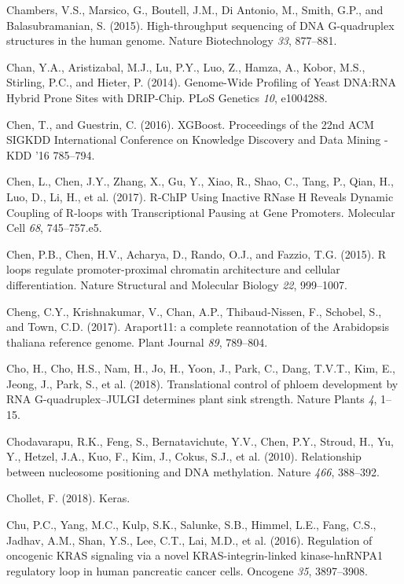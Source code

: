 \documentclass[12pt,a4paper,]{report}
\begin{document}
\leavevmode\hypertarget{ref-Chambers2015}{}%
Chambers, V.S., Marsico, G., Boutell, J.M., Di Antonio, M., Smith, G.P.,
and Balasubramanian, S. (2015). High-throughput sequencing of DNA
G-quadruplex structures in the human genome. Nature Biotechnology
\emph{33}, 877--881.

\leavevmode\hypertarget{ref-Chan2014}{}%
Chan, Y.A., Aristizabal, M.J., Lu, P.Y., Luo, Z., Hamza, A., Kobor,
M.S., Stirling, P.C., and Hieter, P. (2014). Genome-Wide Profiling of
Yeast DNA:RNA Hybrid Prone Sites with DRIP-Chip. PLoS Genetics
\emph{10}, e1004288.

\leavevmode\hypertarget{ref-Chen2016}{}%
Chen, T., and Guestrin, C. (2016). XGBoost. Proceedings of the 22nd ACM
SIGKDD International Conference on Knowledge Discovery and Data Mining -
KDD '16 785--794.

\leavevmode\hypertarget{ref-Chen2017}{}%
Chen, L., Chen, J.Y., Zhang, X., Gu, Y., Xiao, R., Shao, C., Tang, P.,
Qian, H., Luo, D., Li, H., et al. (2017). R-ChIP Using Inactive RNase H
Reveals Dynamic Coupling of R-loops with Transcriptional Pausing at Gene
Promoters. Molecular Cell \emph{68}, 745--757.e5.

\leavevmode\hypertarget{ref-Chen2015}{}%
Chen, P.B., Chen, H.V., Acharya, D., Rando, O.J., and Fazzio, T.G.
(2015). R loops regulate promoter-proximal chromatin architecture and
cellular differentiation. Nature Structural and Molecular Biology
\emph{22}, 999--1007.

\leavevmode\hypertarget{ref-Cheng2017}{}%
Cheng, C.Y., Krishnakumar, V., Chan, A.P., Thibaud-Nissen, F., Schobel,
S., and Town, C.D. (2017). Araport11: a complete reannotation of the
Arabidopsis thaliana reference genome. Plant Journal \emph{89},
789--804.

\leavevmode\hypertarget{ref-Cho2018}{}%
Cho, H., Cho, H.S., Nam, H., Jo, H., Yoon, J., Park, C., Dang, T.V.T.,
Kim, E., Jeong, J., Park, S., et al. (2018). Translational control of
phloem development by RNA G-quadruplex--JULGI determines plant sink
strength. Nature Plants \emph{4}, 1--15.

\leavevmode\hypertarget{ref-Chodavarapu2010}{}%
Chodavarapu, R.K., Feng, S., Bernatavichute, Y.V., Chen, P.Y., Stroud,
H., Yu, Y., Hetzel, J.A., Kuo, F., Kim, J., Cokus, S.J., et al. (2010).
Relationship between nucleosome positioning and DNA methylation. Nature
\emph{466}, 388--392.

\leavevmode\hypertarget{ref-Chollet2018}{}%
Chollet, F. (2018). Keras.

\leavevmode\hypertarget{ref-Chu2016}{}%
Chu, P.C., Yang, M.C., Kulp, S.K., Salunke, S.B., Himmel, L.E., Fang,
C.S., Jadhav, A.M., Shan, Y.S., Lee, C.T., Lai, M.D., et al. (2016).
Regulation of oncogenic KRAS signaling via a novel KRAS-integrin-linked
kinase-hnRNPA1 regulatory loop in human pancreatic cancer cells.
Oncogene \emph{35}, 3897--3908.
\end{document}
